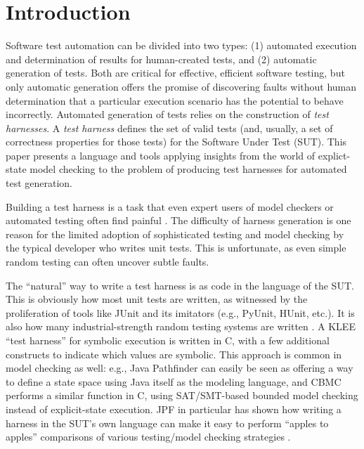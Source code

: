 \section{Introduction}

Software test automation can be divided into two types: (1) automated
execution and determination of results for human-created tests, and
(2) automatic generation of tests.  Both are critical for effective,
efficient software testing, but only automatic generation offers the
promise of discovering faults without human determination that a
particular execution scenario has the potential to behave incorrectly.
Automated generation of tests relies on the construction of \emph{test
  harnesses}.  A \emph{test harness} defines the set of valid tests
(and, usually, a set of correctness properties for those tests) for
the Software Under Test (SUT).  This paper presents a language and
tools applying insights from the world of explict-state model
checking to the problem of producing test harnesses for automated
test generation.

Building a test harness is a task that even expert users of model
checkers or automated testing often find painful
\cite{woda08,woda12}.  The difficulty of harness generation is one
reason for the limited adoption of sophisticated testing and model
checking by the typical developer who writes unit tests.  This is
unfortunate, as even simple random testing can often uncover subtle
faults.

The ``natural'' way to write a test harness is as code in the language
of the SUT.  This is obviously how most unit
tests are written, as witnessed by the proliferation of tools like
JUnit \cite{JUnit} and its imitators (e.g., PyUnit, HUnit, etc.).  It
is also how many industrial-strength random testing systems are
written \cite{ICSEDiff,AMAI}.  A KLEE ``test harness'' \cite{KLEE} for
symbolic execution is written in C, with a few additional constructs
to indicate which values are symbolic.  This approach is common in
model checking as well: e.g., Java Pathfinder \cite{JPF,JPF2} can
easily be seen as offering a way to define a state space using Java
itself as the modeling language, and CBMC \cite{CBMC,CBMCp} performs a
similar function in C, using SAT/SMT-based bounded model checking
instead of explicit-state execution.  JPF in particular has shown how
writing a harness in the SUT's own language can make it easy to
perform ``apples to apples'' comparisons of various testing/model
checking strategies \cite{JPFRandTest}.


